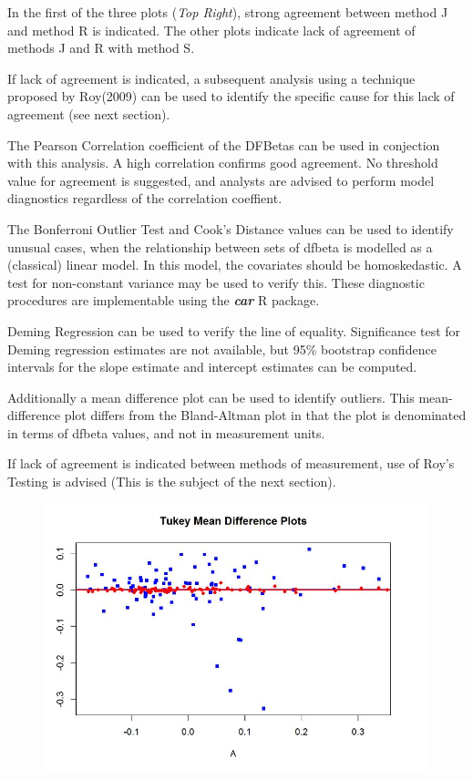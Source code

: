\documentclass[12pt, a4paper]{report}
\theoremstyle{plain}
\theoremstyle{definition}
\theoremstyle{remark}
\begin{document}
In the first of the three plots (\textit{Top Right}), strong agreement between method J and method R is indicated. The other plots indicate lack of agreement of methods J and R with method S.



If lack of agreement is indicated, a subsequent analysis using a technique proposed by Roy(2009) can be used to identify the specific cause for this lack of agreement (see next section).
\newpage

The Pearson Correlation coefficient of the DFBetas can be used in conjection with this analysis. A high correlation confirms good agreement. No threshold value for agreement is suggested, and analysts are advised to perform model diagnostics regardless of the correlation coeffient. 


The Bonferroni Outlier Test and Cook's Distance values can be used to identify unusual cases, when the relationship between sets of dfbeta is modelled as a (classical) linear model. In this model, the covariates should be homoskedastic. A test for non-constant variance may be used to verify this. These diagnostic procedures are implementable using the \textbf{\textit{car}} R package.


Deming Regression can be used to verify the line of equality. Significance test for Deming regression estimates are not available, but 95\% bootstrap confidence intervals for the slope estimate and intercept estimates can be computed. 


Additionally a mean difference plot can be used to identify outliers. This mean-difference plot differs from the Bland-Altman plot in that the plot is denominated in terms of dfbeta values, and not in measurement units.

If lack of agreement is indicated between methods of measurement, use of Roy's Testing is advised (This is the subject of the next section).
\begin{figure}[h1]
	\centering
	\includegraphics[width=0.7\linewidth]{images/04-TMDplot}
	
\end{figure}
\end{document}
